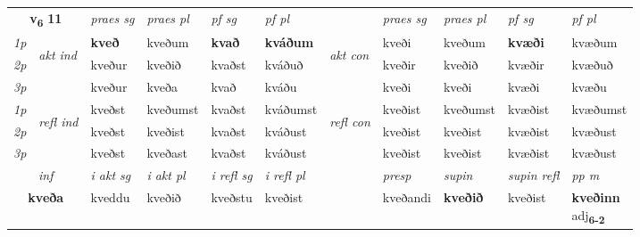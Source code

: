 \noindent
\begin{tabular}{lllllllllll} \toprule
\multicolumn{2}{c}{\textbf{v{\textsubscript{6}}} \Large{\textbf{11}}}  &  \textit{praes sg}  & \textit{praes pl}  &\textit{ pf sg} & \textit{pf pl} &  &  \textit{praes sg}  & \textit{praes pl}  & \textit{pf sg} & \textit{pf pl } \\*
	\cmidrule{3-6} \cmidrule{8-11}
 {\textit{1p}} & \multirow{3}{*}{\begin{turn}{90}\textit{akt ind}\end{turn}} & \textbf{kveð} & kveðum & \textbf{kvað} & \textbf{kváðum} & \multirow{3}{*}{\begin{turn}{90}\textit{akt con}\end{turn}} &kveði & kveðum & \textbf{kvæði} & kvæðum\\*
 {\textit{2p}} &  &  kveður  & kveðið & kvaðst & kváðuð & & kveðir & kveðið & kvæðir & kvæðuð \\*
{\textit{3p}} &  & kveður & kveða & kvað & kváðu & & kveði & kveði& kvæði & kvæðu \\*
\cmidrule{3-6} \cmidrule{8-11}
 {\textit{1p}} & \multirow{3}{*}{\begin{turn}{90}\textit{refl ind}\end{turn}}  & kveðst & kveðumst & kvaðst & kváðumst & \multirow{3}{*}{\begin{turn}{90}\textit{refl con}\end{turn}}  &kveðist & kveðumst & kvæðist & kvæðumst \\*
 {\textit{2p}} &  & kveðst & kveðist & kvaðst & kváðust & &kveðist & kveðist & kvæðist & kvæðust \\*
 {\textit{3p}}  & & kveðst & kveðast & kvaðst & kváðust & & kveðist & kveðist& kvæðist & kvæðust \\*
\cmidrule{3-6} \cmidrule{8-11}

   \multicolumn{2}{c}{\textit{inf}}  & \textit{i akt sg} & \textit{i akt pl} & \textit{i refl sg} & \textit{i refl pl} && \textit{presp} & \textit{supin} & \textit{supin refl} & \textit{pp m} \\*
  \multicolumn{2}{c}{\textbf{kveða}} & kveddu  & kveðið & kveðstu & kveðist && kveðandi &  \textbf{kveðið} & kveðist & \specialcell{\textbf{kveðinn} \\ adj\textbf{\textsubscript{6-2}}} \\*
\end{tabular}

